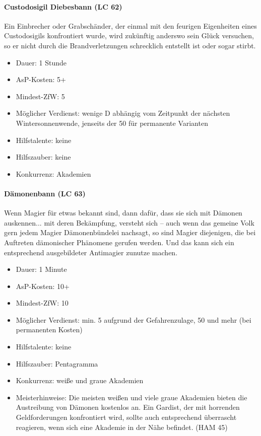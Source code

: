 \paragraph{Custodosigil Diebesbann (LC 62)}
Ein Einbrecher oder Grabschänder, der einmal mit den feurigen Eigenheiten eines Custodosigils konfrontiert wurde, wird zukünftig anderswo sein Glück versuchen, so er nicht durch die Brandverletzungen schrecklich entstellt ist oder sogar stirbt.
\begin{itemize}
	\item Dauer: 1 Stunde
	\item AsP-Kosten: 5+
	\item Mindest-ZfW: 5
	\item Möglicher Verdienst: wenige D abhängig vom Zeitpunkt der nächsten Wintersonnenwende, jenseits der \SI{50}{\D} für permanente Varianten
	\item Hilfstalente: keine
	\item Hilfszauber: keine
	\item Konkurrenz: Akademien
\end{itemize}

\paragraph{Dämonenbann (LC 63)}
Wenn Magier für etwas bekannt sind, dann dafür, dass sie sich mit Dämonen auskennen... mit deren Bekämpfung, versteht sich -- auch wenn das gemeine Volk gern jedem Magier Dämonenbündelei nachsagt, so sind Magier diejenigen, die bei Auftreten dämonischer Phänomene gerufen werden. Und das kann sich ein entsprechend ausgebildeter Antimagier zunutze machen.
\begin{itemize}
	\item Dauer: 1 Minute
	\item AsP-Kosten: 10+
	\item Mindest-ZfW: 10
	\item Möglicher Verdienst: min. \SI{5}{\D} aufgrund der Gefahrenzulage, \SI{50}{\D} und mehr (bei permanenten Kosten)
	\item Hilfstalente: keine
	\item Hilfszauber: Pentagramma
	\item Konkurrenz: weiße und graue Akademien
	\item Meisterhinweise: Die meisten weißen und viele graue Akademien bieten die Austreibung von Dämonen kostenlos an. Ein Gardist, der mit horrenden Geldforderungen konfrontiert wird, sollte auch entsprechend überrascht reagieren, wenn sich eine Akademie in der Nähe befindet. (HAM 45)
\end{itemize}


